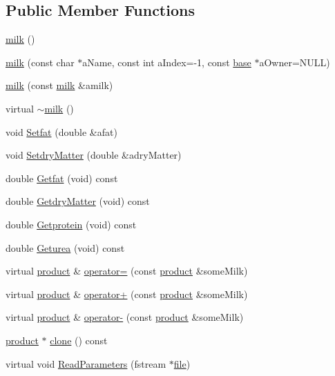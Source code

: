 \subsection*{Public Member Functions}
\begin{DoxyCompactItemize}
\item 
\hyperlink{classmilk_afbca06d2ee59b992a121ac0df503c038}{milk} ()
\item 
\hyperlink{classmilk_a7d96f897491aa8ba5ba7440ef15501d3}{milk} (const char $\ast$aName, const int aIndex=-\/1, const \hyperlink{classbase}{base} $\ast$aOwner=NULL)
\item 
\hyperlink{classmilk_a32902c3e0b0e5c194bd605cca510ddc5}{milk} (const \hyperlink{classmilk}{milk} \&amilk)
\item 
virtual \hyperlink{classmilk_a1128ed2aee0dd59ea5ed3ed1c1433532}{$\sim$milk} ()
\item 
void \hyperlink{classmilk_a23ab5951cc404f938184aa3b44080719}{Setfat} (double \&afat)
\item 
void \hyperlink{classmilk_a69060a252027a2f9f08e42ed6e2a7db3}{SetdryMatter} (double \&adryMatter)
\item 
double \hyperlink{classmilk_a3184a49b16c5140554be2af66d254899}{Getfat} (void) const 
\item 
double \hyperlink{classmilk_ae2e7cd84b885c21b529a48a78295967a}{GetdryMatter} (void) const 
\item 
double \hyperlink{classmilk_aa9b46018d36c0cb685cd185c6008ef65}{Getprotein} (void) const 
\item 
double \hyperlink{classmilk_aee1f5edbd82a3877995fde62a2c56abb}{Geturea} (void) const 
\item 
virtual \hyperlink{classproduct}{product} \& \hyperlink{classmilk_a91f8abdababf02b7204b5bffcbbf2557}{operator=} (const \hyperlink{classproduct}{product} \&someMilk)
\item 
virtual \hyperlink{classproduct}{product} \& \hyperlink{classmilk_aa1c2c44df35bc4ce7f82e448a23acf5f}{operator+} (const \hyperlink{classproduct}{product} \&someMilk)
\item 
virtual \hyperlink{classproduct}{product} \& \hyperlink{classmilk_a904640cf0fbcf990815d26f6c9453edb}{operator-\/} (const \hyperlink{classproduct}{product} \&someMilk)
\item 
\hyperlink{classproduct}{product} $\ast$ \hyperlink{classmilk_a185c7b47cef30f2993c339ca48af7db5}{clone} () const 
\item 
virtual void \hyperlink{classmilk_afad44ced6ab580a41fcc582cb83b87dd}{ReadParameters} (fstream $\ast$\hyperlink{classbase_a3af52ee9891719d09b8b19b42450b6f6}{file})
\end{DoxyCompactItemize}
